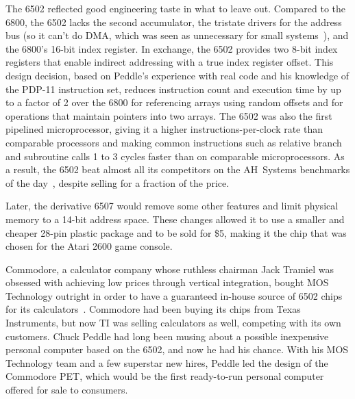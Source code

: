 \begin{tangent}
    The 6502 reflected good engineering taste in what to leave out.
    Compared to the 6800, the 6502 lacks the second accumulator, the
    tristate drivers for the address bus (so it can't do DMA, which was seen as
    unnecessary for small systems~\cite{byte75:6502}), 
    and the 6800's 16-bit index register.  In exchange, the 6502 provides two
     8-bit index registers that enable
    indirect addressing with a true index register offset.
    This design decision, based on Peddle's experience with real
    code and his knowledge of the PDP-11 instruction set, 
    reduces instruction count and execution time by up to a
    factor of 2 over the 6800 for referencing arrays using random
    offsets and for operations that
    maintain pointers into two arrays.
    The 6502 was also the first pipelined
    microprocessor, giving it a higher instructions-per-clock 
    rate than comparable processors and making
    common instructions such as relative
    branch and subroutine calls 1 to 3 cycles faster than
    on comparable microprocessors.  
    As a result, the 6502
    beat almost all its competitors on  the AH~Systems benchmarks of
    the day~\cite{edn75:6502}, despite selling for a fraction of the price.

    Later, the derivative 6507 would
    remove some other features and limit
    physical memory to a 14-bit address space.  These changes allowed it to
    use a smaller and cheaper 28-pin 
    plastic package and to be sold for \$5,
    making it the chip that was chosen for the Atari 2600 game console.
\end{tangent}

Commodore, a calculator company whose ruthless chairman Jack Tramiel was
obsessed with achieving low prices through vertical integration, bought
MOS Technology outright in order to have a guaranteed in-house source of
6502 chips for its calculators~\cite{commodore}.
Commodore had been buying its chips from Texas Instruments,
but now TI was selling calculators as well, competing with its own
customers.
Chuck Peddle had long been musing about a possible inexpensive personal computer based on
the 6502, and now he had his chance.  With his MOS Technology team and a
few superstar new hires, Peddle led the 
design of the Commodore PET, which would be the first ready-to-run
personal computer offered for sale to consumers.

